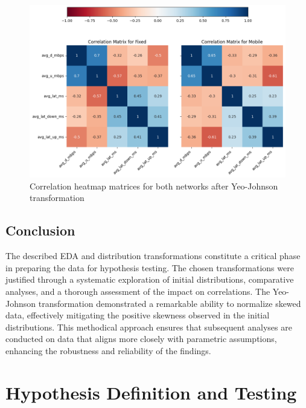 \documentclass[
  letterpaper,
  DIV=11,
  numbers=noendperiod,
  oneside]{scrartcl}
\begin{document}
\begin{figure}[H]

{\centering \includegraphics{data-analytics_files/figure-latex/fig-transheatmaps-output-1.png}

}

\caption{\label{fig-transheatmaps}Correlation heatmap matrices for both
networks after Yeo-Johnson transformation}

\end{figure}

\hypertarget{conclusion}{%
\subsection{Conclusion}\label{conclusion}}

The described EDA and distribution transformations constitute a critical
phase in preparing the data for hypothesis testing. The chosen
transformations were justified through a systematic exploration of
initial distributions, comparative analyses, and a thorough assessment
of the impact on correlations. The Yeo-Johnson transformation
demonstrated a remarkable ability to normalize skewed data, effectively
mitigating the positive skewness observed in the initial distributions.
This methodical approach ensures that subsequent analyses are conducted
on data that aligns more closely with parametric assumptions, enhancing
the robustness and reliability of the findings.

\hypertarget{hypothesis-definition-and-testing}{%
\section{Hypothesis Definition and
Testing}\label{hypothesis-definition-and-testing}}
\end{document}
